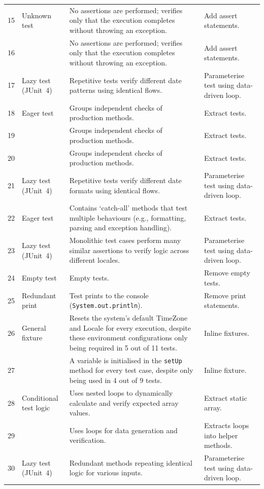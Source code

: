 \begin{xltabular}{\linewidth}{r l X l}
    15 & Unknown test & No assertions are performed; verifies only that the execution completes without throwing an exception. & Add assert statements. \\
    16 & & No assertions are performed; verifies only that the execution completes without throwing an exception. & Add assert statements. \\
    17 & Lazy test (JUnit~4) & Repetitive tests verify different date patterns using identical flows. & Parameterise test using data-driven loop. \\
    18 & Eager test & Groups independent checks of production methods. & Extract tests. \\
    19 & & Groups independent checks of production methods. & Extract tests. \\
    20 & & Groups independent checks of production methods. & Extract tests. \\
    21 & Lazy test (JUnit~4) & Repetitive tests verify different date formats using identical flows. & Parameterise test using data-driven loop. \\
    22 & Eager test & Contains `catch-all' methods that test multiple behaviours (e.g., formatting, parsing and exception handling). & Extract tests. \\
    23 & Lazy test (JUnit~4) & Monolithic test cases perform many similar assertions to verify logic across different locales. & Parameterise test using data-driven loop. \\
    24 & Empty test & Empty tests. & Remove empty tests. \\
    25 & Redundant print & Test prints to the console (\texttt{System.out.println}). & Remove print statements. \\
    26 & General fixture & Resets the system's default TimeZone and Locale for every execution, despite these environment configurations only being required in 5 out of 11 tests. & Inline fixtures. \\
    27 & & A variable is initialised in the \texttt{setUp} method for every test case, despite only being used in 4 out of 9 tests. & Inline fixture. \\
    28 & Conditional test logic & Uses nested loops to dynamically calculate and verify expected array values. & Extract static array. \\
    29 & & Uses loops for data generation and verification. & Extracts loops into helper methods. \\
    30 & Lazy test (JUnit~4) & Redundant methods repeating identical logic for various inputs. & Parameterise test using data-driven loop. \\

\end{xltabular}
